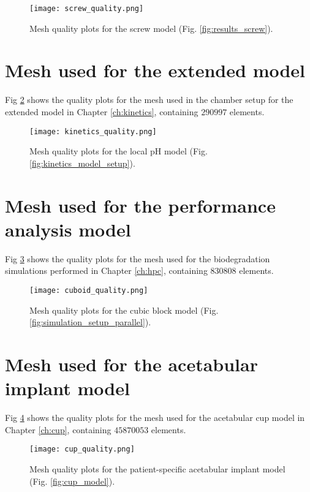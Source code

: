 \begin{figure}[h]
\centering
\medskip
\texttt{[image: screw\_quality.png]}
\caption[Mesh quality plots for the screw model]{Mesh quality plots for the screw model (Fig. \ref{fig:results_screw}).} \label{fig:appendix_screw}
\end{figure}


\section{Mesh used for the extended model}

Fig \ref{fig:appendix_kinetics} shows the quality plots for the mesh used in the chamber setup for the extended model in Chapter \ref{ch:kinetics}, containing $\num{290997}$ elements.

\begin{figure}[h]
\centering
\medskip
\texttt{[image: kinetics\_quality.png]}
\caption[Mesh quality plots for the local pH model]{Mesh quality plots for the local pH model (Fig. \ref{fig:kinetics_model_setup}).} \label{fig:appendix_kinetics}
\end{figure}

\section{Mesh used for the performance analysis model}

Fig \ref{fig:appendix_cuboid} shows the quality plots for the mesh used for the biodegradation simulations performed in Chapter \ref{ch:hpc}, containing $\num{830808}$ elements.

\begin{figure}[h]
\centering
\medskip
\texttt{[image: cuboid\_quality.png]}
\caption[Mesh quality plots for the cubic block model]{Mesh quality plots for the cubic block model (Fig. \ref{fig:simulation_setup_parallel}).} \label{fig:appendix_cuboid}
\end{figure}

\section{Mesh used for the acetabular implant model}

Fig \ref{fig:appendix_cup} shows the quality plots for the mesh used for the acetabular cup model in Chapter \ref{ch:cup}, containing $\num{45870053}$ elements.

\begin{figure}[h]
\centering
\medskip
\texttt{[image: cup\_quality.png]}
\caption[Mesh quality plots for the patient-specific acetabular implant model]{Mesh quality plots for the patient-specific acetabular implant model (Fig. \ref{fig:cup_model}).} \label{fig:appendix_cup}
\end{figure}

